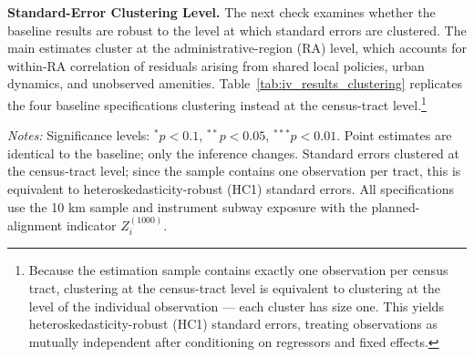 \noindent
\textbf{Standard-Error Clustering Level.} The next check examines whether the baseline results are robust to the level at which standard errors are clustered. The main estimates cluster at the administrative-region (RA) level, which accounts for within-RA correlation of residuals arising from shared local policies, urban dynamics, and unobserved amenities. Table~\ref{tab:iv_results_clustering} replicates the four baseline specifications clustering instead at the census-tract level.\footnote{Because the estimation sample contains exactly one observation per census tract, clustering at the census-tract level is equivalent to clustering at the level of the individual observation --- each cluster has size one. This yields heteroskedasticity-robust (HC1) standard errors, treating observations as mutually independent after conditioning on regressors and fixed effects.}

\begin{table}[htbp]
\centering
\caption{Effect of subway exposure on income growth: robustness to clustering level}
\label{tab:iv_results_clustering}
\begin{tablenotes}
\scriptsize
\item \textit{Notes:} Significance levels: $^{*}p<0.1$, $^{**}p<0.05$, $^{***}p<0.01$. Point estimates are identical to the baseline; only the inference changes. Standard errors clustered at the census-tract level; since the sample contains one observation per tract, this is equivalent to heteroskedasticity-robust (HC1) standard errors. All specifications use the 10 km sample and instrument subway exposure with the planned-alignment indicator $Z_i^{(1000)}$.
\end{tablenotes}
\end{table}

